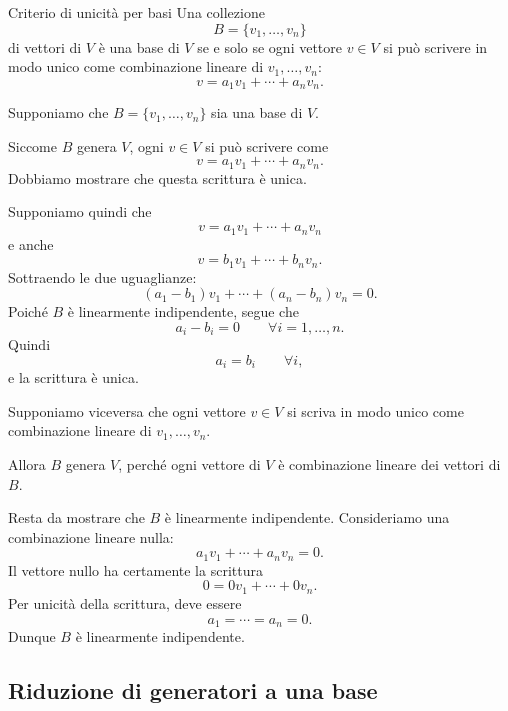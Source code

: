\documentclass[a4paper]{article}
\begin{document}
\begin{snippetproposition}{Criterio di unicità per basi}
    Una collezione
    \[
        B=\{v_1,\ldots,v_n\}
    \]
    di vettori di \(V\) è una base di \(V\) se e solo se ogni vettore \(v\in V\) si può scrivere in modo unico come combinazione lineare di \(v_1,\ldots,v_n\):
    \[
        v=a_1v_1+\cdots+a_nv_n.
    \]
\end{snippetproposition}

\begin{snippetproof}{}
    \begin{iffproof}
    \item Supponiamo che \(B=\{v_1,\ldots,v_n\}\) sia una base di \(V\).

        Siccome \(B\) genera \(V\), ogni \(v\in V\) si può scrivere come
        \[
            v=a_1v_1+\cdots+a_nv_n.
        \]
        Dobbiamo mostrare che questa scrittura è unica.

        Supponiamo quindi che
        \[
            v=a_1v_1+\cdots+a_nv_n
        \]
        e anche
        \[
            v=b_1v_1+\cdots+b_nv_n.
        \]
        Sottraendo le due uguaglianze:
        \[
            (a_1-b_1)v_1+\cdots+(a_n-b_n)v_n=0.
        \]
        Poiché \(B\) è linearmente indipendente, segue che
        \[
            a_i-b_i=0
            \qquad
            \forall i=1,\ldots,n.
        \]
        Quindi
        \[
            a_i=b_i
            \qquad
            \forall i,
        \]
        e la scrittura è unica.

    \item Supponiamo viceversa che ogni vettore \(v\in V\) si scriva in modo unico come combinazione lineare di \(v_1,\ldots,v_n\).

        Allora \(B\) genera \(V\), perché ogni vettore di \(V\) è combinazione lineare dei vettori di \(B\).

        Resta da mostrare che \(B\) è linearmente indipendente. Consideriamo una combinazione lineare nulla:
        \[
            a_1v_1+\cdots+a_nv_n=0.
        \]
        Il vettore nullo ha certamente la scrittura
        \[
            0=0v_1+\cdots+0v_n.
        \]
        Per unicità della scrittura, deve essere
        \[
            a_1=\cdots=a_n=0.
        \]
        Dunque \(B\) è linearmente indipendente.
    \end{iffproof}
\end{snippetproof}

\subsection{Riduzione di generatori a una base}
\end{document}
